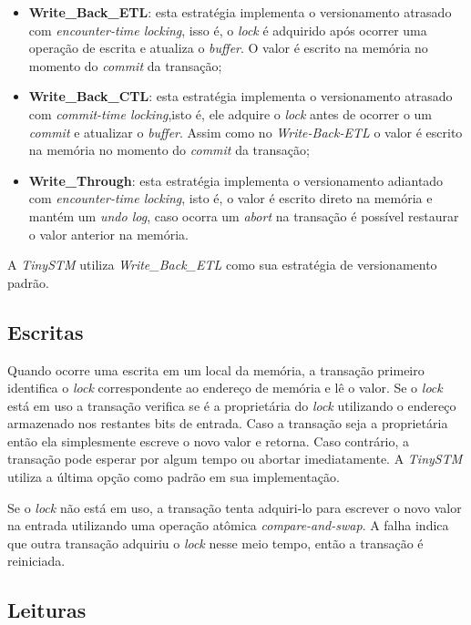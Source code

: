 \documentclass[diss,capa]{texufpel}
\begin{document}
\begin{itemize}
 \item \textbf{Write\_Back\_ETL}: esta estratégia implementa o versionamento atrasado com \emph{encounter-time locking}, isso é, o \emph{lock} é adquirido após ocorrer uma operação de escrita e atualiza o \emph{buffer}. O valor é escrito na memória no momento do \emph{commit} da transação;

 \item \textbf{Write\_Back\_CTL}: esta estratégia implementa o versionamento atrasado com \emph{commit-time locking},isto é, ele adquire o \emph{lock} antes de ocorrer o um \emph{commit} e atualizar o \emph{buffer}. Assim como no \emph{Write-Back-ETL} o valor é escrito na memória no momento do \emph{commit} da transação;

 \item \textbf{Write\_Through}: esta estratégia implementa o versionamento adiantado com \emph{encounter-time locking}, isto é, o valor é escrito direto na memória e mantém um \emph{undo log}, caso ocorra um \emph{abort} na transação é possível restaurar o valor anterior na memória.
\end{itemize}

A \emph{TinySTM} utiliza \emph{Write\_Back\_ETL} como sua estratégia de versionamento padrão.

\subsection{Escritas}

Quando ocorre uma escrita em um local da memória, a transação primeiro identifica o \emph{lock} correspondente ao endereço de memória e lê o valor. Se o \emph{lock} está em uso a transação verifica se é a proprietária do \emph{lock} utilizando o endereço armazenado nos restantes bits de entrada. Caso a transação seja a proprietária então ela simplesmente escreve o novo valor e retorna. Caso contrário, a transação pode esperar por algum tempo ou abortar imediatamente. A \emph{TinySTM} utiliza a última opção como padrão em sua implementação.

Se o \emph{lock} não está em uso, a transação tenta adquiri-lo para escrever o novo valor na entrada utilizando uma operação atômica \emph{compare-and-swap}. A falha indica que outra transação adquiriu o \emph{lock} nesse meio tempo, então a transação é reiniciada.


\subsection{Leituras}
\end{document}
